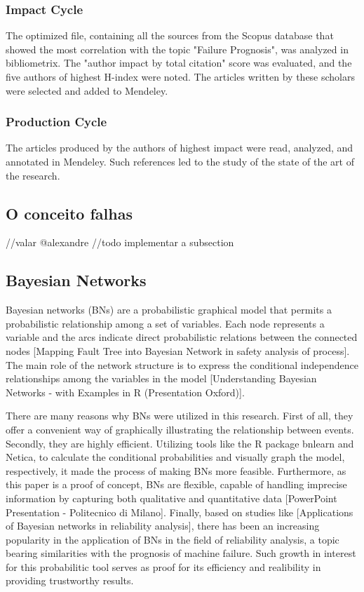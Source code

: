 \subsubsection{Impact Cycle}
The optimized file, containing all the sources from the Scopus database that showed the most correlation with the topic "Failure Prognosis", was analyzed in bibliometrix. 
The "author impact by total citation" score was evaluated, and the five authors of highest H-index were noted. The articles written by these scholars were selected and added to Mendeley.

\subsubsection{Production Cycle}
The articles produced by the authors of highest impact were read, analyzed, and annotated in Mendeley.
Such references led to the study of the state of the art of the research.

\subsection{O conceito falhas}
//valar @alexandre
//todo implementar a subsection


\subsection{Bayesian Networks}
Bayesian networks (BNs) are a probabilistic graphical model that  permits  a  probabilistic  relationship  among a set of variables.  Each  node  represents  a  variable  and  the  arcs  indicate  direct probabilistic  relations  between  the  connected  nodes [Mapping Fault Tree into Bayesian Network in safety analysis of process]. The main role of the network structure is to express the conditional independence relationships among the variables in the model [Understanding Bayesian Networks - with Examples in R (Presentation Oxford)].

There are many reasons why BNs were utilized in this research. First of all, they offer a convenient way of graphically illustrating the relationship between events. Secondly, they are highly efficient. Utilizing tools like the R package bnlearn and Netica, to calculate the conditional probabilities and visually graph the model, respectively, it made the process of making BNs more feasible. Furthermore, as this paper is a proof of concept, BNs are flexible, capable of handling imprecise information by capturing both qualitative and quantitative data [PowerPoint Presentation - Politecnico di Milano]. Finally, based on studies like [Applications of Bayesian networks in reliability analysis], there has been an increasing popularity in the application of BNs in the field of reliability analysis, a topic bearing similarities with the prognosis of machine failure. Such growth in interest for this probabilitic tool serves as proof for its efficiency and realibility in providing trustworthy results.


